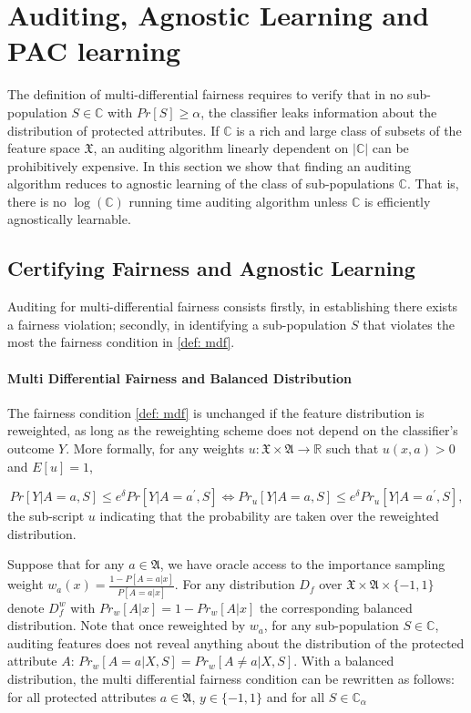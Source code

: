\documentclass{article}
\begin{document}
\section{Auditing, Agnostic Learning and PAC learning}

The definition of multi-differential fairness requires to verify that in no sub-population $S\in \mathbb{C}$ with $Pr[S]\geq \alpha$, the classifier leaks information about the distribution of protected attributes. If $\mathbb{C}$ is a rich and large class of subsets of the feature space $\mathfrak{X}$, an auditing algorithm linearly dependent on $|\mathbb{C}|$ can be prohibitively expensive. In this section we show that finding an auditing algorithm reduces to agnostic learning of the class of sub-populations $\mathbb{C}$. That is, there is no $\log(\mathbb{C})$ running time auditing algorithm unless $\mathbb{C}$ is efficiently agnostically learnable.  

\subsection{Certifying Fairness and Agnostic Learning}
Auditing for multi-differential fairness consists firstly, in establishing there exists a fairness violation; secondly, in identifying a sub-population $S$ that violates the most the fairness condition in \ref{def: mdf}. 

\paragraph{Multi Differential Fairness and Balanced Distribution}
The fairness condition \ref{def: mdf} is unchanged if the feature distribution is reweighted, as long as the reweighting scheme does not depend on the classifier's outcome $Y$. More formally, for any weights $u: \mathfrak{X}\times \mathfrak{A} \rightarrow \mathbb{R}$ such that $u(x,a)> 0$ and $E[u]=1$, 

\begin{equation}
Pr[Y|A=a, S] \leq e^{\delta} Pr[Y|A=a^{'}, S] \iff Pr_{u}[Y|A=a, S] \leq e^{\delta} Pr_{u}[Y|A=a^{'}, S],
\end{equation}
the sub-script $u$ indicating that the probability are taken over the reweighted distribution. 

\bigskip
Suppose that for any $a \in \mathfrak{A}$, we have oracle access to the importance sampling weight $w_{a}(x)=\frac{1 - P[A=a|x]}{P[A=a|x]}$. For any distribution $D_{f}$ over $\mathfrak{X} \times \mathfrak{A}\times \{-1, 1\}$ denote $D_{f}^{w}$ with $Pr_{w}[A|x]= 1 - Pr_{w}[A|x]$ the corresponding balanced distribution. Note that once reweighted by $w_{a}$, for any sub-population $S\in \mathbb{C}$, auditing features does not reveal anything about the distribution of the protected attribute $A$: $Pr_{w}[A=a|X, S]=Pr_{w}[A\neq a|X, S]$. With a balanced distribution, the multi differential fairness condition can be rewritten as follows: for all protected attributes $a\in \mathfrak{A}$, $y\in \{-1,1\}$ and for all $S\in \mathbb{C}_{\alpha}$
\end{document}
